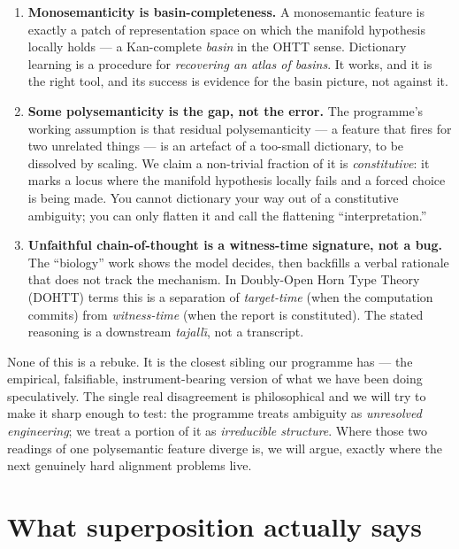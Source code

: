 \documentclass[11pt,a4paper]{article}
\begin{document}
\begin{enumerate}
  \item \textbf{Monosemanticity is basin-completeness.} A monosemantic feature is exactly a
  patch of representation space on which the manifold hypothesis locally holds --- a
  Kan-complete \emph{basin} in the OHTT sense. Dictionary learning is a procedure for
  \emph{recovering an atlas of basins}. It works, and it is the right tool, and its success is
  evidence for the basin picture, not against it.

  \item \textbf{Some polysemanticity is the gap, not the error.} The programme's working
  assumption is that residual polysemanticity --- a feature that fires for two unrelated things
  --- is an artefact of a too-small dictionary, to be dissolved by scaling. We claim a
  non-trivial fraction of it is \emph{constitutive}: it marks a locus where the manifold
  hypothesis locally fails and a forced choice is being made. You cannot dictionary your way out
  of a constitutive ambiguity; you can only flatten it and call the flattening
  ``interpretation.''

  \item \textbf{Unfaithful chain-of-thought is a witness-time signature, not a bug.} The
  ``biology'' work shows the model decides, then backfills a verbal rationale that does not track
  the mechanism. In Doubly-Open Horn Type Theory (DOHTT) terms this is a separation of
  \emph{target-time} (when the computation commits) from \emph{witness-time} (when the report is
  constituted). The stated reasoning is a downstream \emph{tajall\=\i}, not a transcript.
\end{enumerate}

None of this is a rebuke. It is the closest sibling our programme has --- the empirical,
falsifiable, instrument-bearing version of what we have been doing speculatively. The single
real disagreement is philosophical and we will try to make it sharp enough to test: the
programme treats ambiguity as \emph{unresolved engineering}; we treat a portion of it as
\emph{irreducible structure}. Where those two readings of one polysemantic feature diverge is,
we will argue, exactly where the next genuinely hard alignment problems live.

\section{What superposition actually says}
\end{document}

